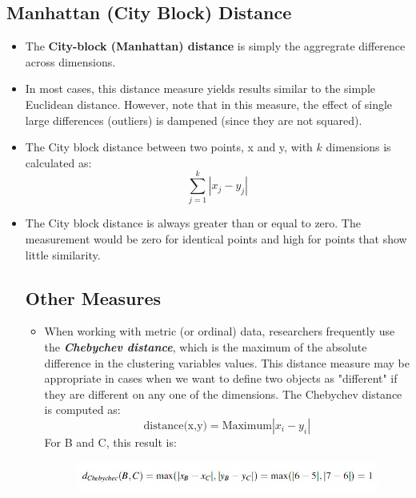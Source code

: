 \documentclass[a4paper,12pt]{report}
\begin{document}
\subsection{Manhattan (City Block) Distance}
\begin{itemize}
\item The \textbf{City-block (Manhattan) distance} is simply the aggregrate difference across dimensions. 
\item In most cases, this distance measure yields results similar to the simple Euclidean distance. However, note that in this measure, the effect of single large differences (outliers) is dampened (since they are not squared). 


\item 
The City block distance between two points, x and y, with $k$ dimensions is calculated as:
\[ \sum^{k}_{j=1} | x_j - y_j |  \]

\item The City block distance is always greater than or equal to zero. The measurement would be zero for identical points and high for points that show little similarity.




\newpage
\subsection{Other Measures}
\begin{itemize}
\item When working with metric (or ordinal) data, researchers frequently use
the \textbf{\textit{Chebychev distance}}, which is the maximum of the absolute difference in the
clustering variables values. This distance measure may be appropriate in cases when we want to define two objects as "different" if they are different on any one of the dimensions. The Chebychev distance is computed as:
\[\mbox{distance(x,y)} = \mbox{Maximum}|x_i - y_i|\] For B and C, this result is:

\begin{figure}[h!]
	\begin{center}
		\includegraphics[scale=0.6]{images/Chebyshev.jpg}\\
	\end{center}
\end{figure}



\end{itemize}
\end{itemize}
\end{document}
